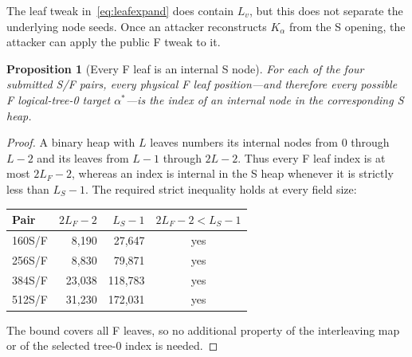 \documentclass[11pt,a4paper]{article}
\newtheorem{proposition}[theorem]{Proposition}
\begin{document}
The leaf tweak in~\eqref{eq:leafexpand} does contain $L_v$, but this does not
separate the underlying node seeds.  Once an attacker reconstructs $K_\alpha$
from the S opening, the attacker can apply the public F tweak to it.

\begin{proposition}[Every F leaf is an internal S node]\label{prop:heapbound}
For each of the four submitted S/F pairs, every physical F leaf position---and
therefore every possible F logical-tree-0 target $\alpha^*$---is the index of an
internal node in the corresponding S heap.
\end{proposition}
\begin{proof}
A binary heap with $L$ leaves numbers its internal nodes from $0$ through $L-2$
and its leaves from $L-1$ through $2L-2$.  Thus every F leaf index is at most
$2L_F-2$, whereas an index is internal in the S heap whenever it is strictly
less than $L_S-1$.  The required strict inequality holds at every field size:
\begin{center}
\begin{tabular}{lrrc}
\toprule
Pair & $2L_F-2$ & $L_S-1$ & $2L_F-2<L_S-1$\\
\midrule
160S/F &  8,190 &  27,647 & yes\\
256S/F &  8,830 &  79,871 & yes\\
384S/F & 23,038 & 118,783 & yes\\
512S/F & 31,230 & 172,031 & yes\\
\bottomrule
\end{tabular}
\end{center}
The bound covers all F leaves, so no additional property of the interleaving map
or of the selected tree-0 index is needed.
\end{proof}
\end{document}
